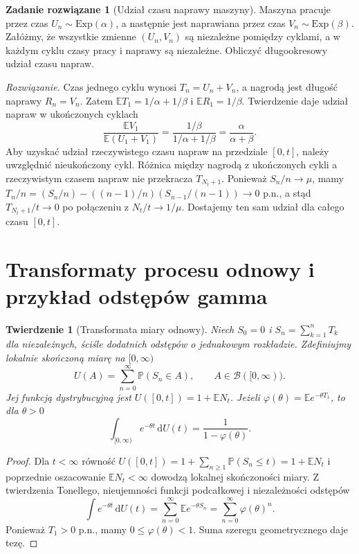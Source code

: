 \documentclass[11pt,a4paper,oneside]{report}
\numberwithin{equation}{chapter}
\theoremstyle{plain}
\newtheorem{twierdzenie}{Twierdzenie}[chapter]
\theoremstyle{definition}
\newtheorem{zadanie}{Zadanie rozwiązane}[chapter]
\theoremstyle{remark}
\newcommand{\Prob}{\mathbb{P}}
\newcommand{\E}{\mathbb{E}}
\newcommand{\calB}{\mathcal{B}}
\newcommand{\dd}{\mathrm{d}}
\begin{document}
\begin{zadanie}[Udział czasu naprawy maszyny]
Maszyna pracuje przez czas $U_n\sim\mathrm{Exp}(\alpha)$,
a następnie jest naprawiana przez czas
$V_n\sim\mathrm{Exp}(\beta)$. Załóżmy, że wszystkie
zmienne $(U_n,V_n)$ są niezależne pomiędzy cyklami,
a w każdym cyklu czasy pracy i naprawy są niezależne.
Obliczyć długookresowy udział czasu napraw.

\emph{Rozwiązanie.} Czas jednego cyklu wynosi
$T_n=U_n+V_n$, a nagrodą jest długość naprawy $R_n=V_n$.
Zatem $\E T_1=1/\alpha+1/\beta$ i $\E R_1=1/\beta$.
Twierdzenie daje udział napraw w ukończonych cyklach
\[
\frac{\E V_1}{\E(U_1+V_1)}
=\frac{1/\beta}{1/\alpha+1/\beta}
=\frac{\alpha}{\alpha+\beta}.
\]
Aby uzyskać udział rzeczywistego czasu napraw na przedziale
$[0,t]$, należy uwzględnić nieukończony cykl. Różnica
między nagrodą z ukończonych cykli a rzeczywistym czasem
napraw nie przekracza $T_{N_t+1}$. Ponieważ
$S_n/n\to\mu$, mamy
$T_n/n=(S_n/n)-((n-1)/n)(S_{n-1}/(n-1))\to0$ p.n.,
a stąd $T_{N_t+1}/t\to0$ po połączeniu z $N_t/t\to1/\mu$.
Dostajemy ten sam udział dla całego czasu $[0,t]$.
\end{zadanie}


\section{Transformaty procesu odnowy i przykład odstępów gamma}
\begin{twierdzenie}[Transformata miary odnowy]
Niech $S_0=0$ i $S_n=\sum_{k=1}^nT_k$ dla niezależnych,
ściśle dodatnich odstępów o jednakowym rozkładzie.
Zdefiniujmy lokalnie skończoną miarę na $[0,\infty)$
\[
U(A)=\sum_{n=0}^\infty\Prob(S_n\in A),\qquad
A\in\calB([0,\infty)).
\]
Jej funkcją dystrybucyjną jest $U([0,t])=1+\E N_t$.
Jeżeli $\varphi(\theta)=\E e^{-\theta T_1}$, to dla $\theta>0$
\[
\int_{[0,\infty)}e^{-\theta t}\,\dd U(t)
=\frac{1}{1-\varphi(\theta)}.
\]
\end{twierdzenie}
\begin{proof}
Dla $t<\infty$ równość
$U([0,t])=1+\sum_{n\ge1}\Prob(S_n\le t)=1+\E N_t$
i poprzednie oszacowanie $\E N_t<\infty$ dowodzą
lokalnej skończoności miary. Z twierdzenia Tonellego,
nieujemności funkcji podcałkowej i niezależności odstępów
\[
\int e^{-\theta t}\,\dd U(t)
=\sum_{n=0}^\infty\E e^{-\theta S_n}
=\sum_{n=0}^\infty \varphi(\theta)^n.
\]
Ponieważ $T_1>0$ p.n., mamy $0\le\varphi(\theta)<1$.
Suma szeregu geometrycznego daje tezę.
\end{proof}
\end{document}
